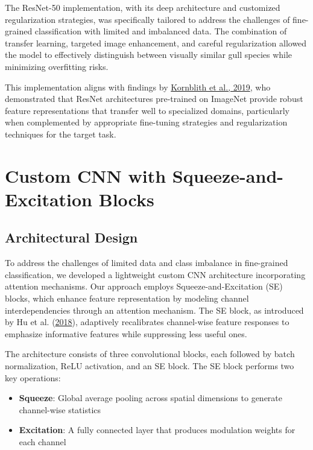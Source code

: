 \documentclass[a4paper,12pt]{article}
\begin{document}
The ResNet-50 implementation, with its deep architecture and customized regularization strategies, was specifically tailored to address the challenges of fine-grained classification with limited and imbalanced data. The combination of transfer learning, targeted image enhancement, and careful regularization allowed the model to effectively distinguish between visually similar gull species while minimizing overfitting risks.

This implementation aligns with findings by {\href{https://arxiv.org/abs/1901.09076}{Kornblith et al., 2019}}, who demonstrated that ResNet architectures pre-trained on ImageNet provide robust feature representations that transfer well to specialized domains, particularly when complemented by appropriate fine-tuning strategies and regularization techniques for the target task.

\section{Custom CNN with Squeeze-and-Excitation Blocks}

\subsection{Architectural Design}

To address the challenges of limited data and class imbalance in fine-grained classification, we developed a lightweight custom CNN architecture incorporating attention mechanisms. Our approach employs Squeeze-and-Excitation (SE) blocks, which enhance feature representation by modeling channel interdependencies through an attention mechanism. The SE block, as introduced by Hu et al. (\href{https://openaccess.thecvf.com/content_cvpr_2018/papers/Hu_Squeeze-and-Excitation_Networks_CVPR_2018_paper.pdf}{2018}), adaptively recalibrates channel-wise feature responses to emphasize informative features while suppressing less useful ones.

The architecture consists of three convolutional blocks, each followed by batch normalization, ReLU activation, and an SE block. The SE block performs two key operations:
\begin{itemize}
    \item \textbf{Squeeze}: Global average pooling across spatial dimensions to generate channel-wise statistics
    \item \textbf{Excitation}: A fully connected layer that produces modulation weights for each channel
\end{itemize}
\end{document}
